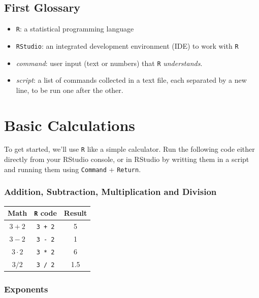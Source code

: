\documentclass[]{book}
\providecommand{\tightlist}{%
  \setlength{\itemsep}{0pt}\setlength{\parskip}{0pt}}
\begin{document}
\hypertarget{first-glossary}{%
\subsection{First Glossary}\label{first-glossary}}

\begin{itemize}
\tightlist
\item
  \texttt{R}: a statistical programming language
\item
  \texttt{RStudio}: an integrated development environment (IDE) to work with \texttt{R}
\item
  \emph{command}: user input (text or numbers) that \texttt{R} \emph{understands}.
\item
  \emph{script}: a list of commands collected in a text file, each separated by a new line, to be run one after the other.
\end{itemize}

\hypertarget{basic-calculations}{%
\section{Basic Calculations}\label{basic-calculations}}

To get started, we'll use \texttt{R} like a simple calculator. Run the following code either directly from your RStudio console, or in RStudio by writting them in a script and running them using \texttt{Command} + \texttt{Return}.

\hypertarget{addition-subtraction-multiplication-and-division}{%
\subsubsection*{Addition, Subtraction, Multiplication and Division}\label{addition-subtraction-multiplication-and-division}}

\begin{longtable}[]{@{}ccc@{}}
\toprule
Math & \texttt{R} code & Result\tabularnewline
\midrule
\endhead
\(3 + 2\) & \texttt{3\ +\ 2} & 5\tabularnewline
\(3 - 2\) & \texttt{3\ -\ 2} & 1\tabularnewline
\(3 \cdot2\) & \texttt{3\ *\ 2} & 6\tabularnewline
\(3 / 2\) & \texttt{3\ /\ 2} & 1.5\tabularnewline
\bottomrule
\end{longtable}

\hypertarget{exponents}{%
\subsubsection*{Exponents}\label{exponents}}
\end{document}
